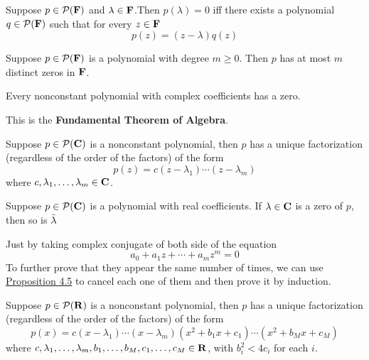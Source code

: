 \documentclass[12pt,a4paper]{article}
\begin{document}
    \begin{prop}\label{4.5}
        Suppose $p\in\mathcal{P}(\mathbf{F})$ and $\lambda\in\mathbf{F}$.Then $p(\lambda)=0$ iff there exists a polynomial $q\in\mathcal{P}(\mathbf{F})$ such that for every $z\in\mathbf{F}$
        $$
        p(z)=(z-\lambda)q(z)
        $$
    \end{prop}
    \hfill

    \begin{prop}
        Suppose $p\in\mathcal{P}(\mathbf{F})$ is a polynomial with degree $m\geq 0$. Then $p$ has at most $m$ distinct zeros in $\mathbf{F}$.
    \end{prop}
    \hfill

    \begin{thm}\label{4.7}
        Every nonconstant polynomial with complex coefficients has a zero.
    \end{thm}
    \begin{remark}
        This is the \textbf{Fundamental Theorem of Algebra}.
    \end{remark}
    \hfill

    \begin{prop}
        Suppose $p\in\mathcal{P}(\mathbf{C})$ is a nonconstant polynomial, then $p$ has a unique factorization (regardless of the order of the factors) of the form
        $$p(z)=c(z-\lambda_1)\cdots(z-\lambda_m)$$
        where $c,\lambda_1,\dots,\lambda_m\in\mathbf{C}$.
    \end{prop}
    \hfill

    \begin{prop}
        Suppose $p\in\mathcal{P}(\mathbf{C})$ is a polynomial with real coefficients. If $\lambda\in\mathbf{C}$ is a zero of $p$, then so is $\Bar{\lambda}$
    \end{prop}
    \begin{remark}
        Just by taking complex conjugate of both side of the equation
        $$
        a_0+a_1z+\cdots+a_mz^m=0
        $$
        To further prove that they appear the same number of times, we can use \hyperref[4.5]{Proposition 4.5} to cancel each one of them and then prove it by induction.
    \end{remark}
    \hfill

    \begin{prop}
        Suppose $p\in\mathcal{P}(\mathbf{R})$ is a nonconstant polynomial, then $p$ has a unique factorization (regardless of the order of the factors) of the form
        $$p(x)=c(x-\lambda_1)\cdots(x-\lambda_m)(x^2+b_1x+c_1)\cdots(x^2+b_Mx+c_M)$$
        where $c,\lambda_1,\dots,\lambda_m,b_1,\dots,b_M,c_1,\dots,c_M\in\mathbf{R}$, with $b_i^2<4c_i$ for each $i$.
    \end{prop}
    \hfill
\end{document}
